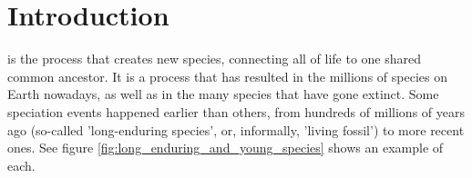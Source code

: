 \chapter{Introduction}
\label{chapter_introduction}












\newpage

\noindent 
{} is the process that creates new species,
connecting all of life to one shared common ancestor. It is a process
that has resulted in the millions of species on Earth nowadays, 
as well as in the many species that have gone extinct. 
Some speciation events happened earlier than others,
from hundreds of millions of years ago (so-called 'long-enduring species',
or, informally, 'living fossil') 
to more recent ones. See figure \ref{fig:long_enduring_and_young_species} 
shows an example of each.

